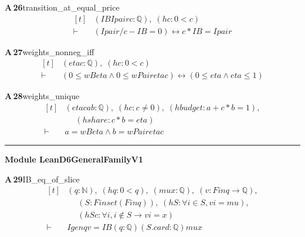 \documentclass[conference]{IEEEtran}
\theoremstyle{definition}
\newcommand{\lean}[1]{\textsf{\footnotesize #1}}
\begin{document}
\noindent\textbf{A\,26}\quad\lean{transition\_at\_equal\_price}
{\footnotesize\[ \begin{aligned}[t]
&(\mathit{IB} \mathit{Ipair} \mathit{c} : \mathbb{Q} ),\; (\mathit{hc} : 0 < \mathit{c})\\
\vdash\;&(\mathit{Ipair} / \mathit{c} - \mathit{IB} = 0) \leftrightarrow \mathit{c} * \mathit{IB} = \mathit{Ipair}
\end{aligned} \]}

\noindent\textbf{A\,27}\quad\lean{weights\_nonneg\_iff}
{\footnotesize\[ \begin{aligned}[t]
&(\mathit{eta} \mathit{c} : \mathbb{Q} ),\; (\mathit{hc} : 0 < \mathit{c})\\
\vdash\;&(0 \leq \mathit{wB} \mathit{eta} \wedge 0 \leq \mathit{wPair} \mathit{eta} \mathit{c}) \leftrightarrow (0 \leq \mathit{eta} \wedge \mathit{eta} \leq 1)
\end{aligned} \]}

\noindent\textbf{A\,28}\quad\lean{weights\_unique}
{\footnotesize\[ \begin{aligned}[t]
&(\mathit{eta} \mathit{c} \mathit{a} \mathit{b} : \mathbb{Q} ),\; (\mathit{hc} : \mathit{c} \neq 0),\; (\mathit{hbudget} : \mathit{a} + \mathit{c} * \mathit{b} = 1),\\
&\quad \; (\mathit{hshare} : \mathit{c} * \mathit{b} = \mathit{eta})\\
\vdash\;&\mathit{a} = \mathit{wB} \mathit{eta} \wedge \mathit{b} = \mathit{wPair} \mathit{eta} \mathit{c}
\end{aligned} \]}

\vspace{4pt}\noindent\rule{\columnwidth}{0.4pt}\par\vspace{2pt}
\noindent\textbf{Module \lean{LeanD6GeneralFamilyV1}}\par\vspace{3pt}

\noindent\textbf{A\,29}\quad\lean{IB\_eq\_of\_slice}
{\footnotesize\[ \begin{aligned}[t]
&(\mathit{q} : \mathbb{N} ),\; (\mathit{hq} : 0 < \mathit{q}),\; (\mathit{mu} \mathit{x} : \mathbb{Q} ),\; (\mathit{v} : \mathit{Fin} \mathit{q} \to \mathbb{Q} ),\\
&\quad \; (\mathit{S} : \mathit{Finset} (\mathit{Fin} \mathit{q})),\; (\mathit{hS} : \forall \mathit{i} \in \mathit{S}, \mathit{v} \mathit{i} = \mathit{mu}),\\
&\quad \; (\mathit{hSc} : \forall \mathit{i}, \mathit{i} \notin \mathit{S} \to \mathit{v} \mathit{i} = \mathit{x})\\
\vdash\;&\mathit{Igen} \mathit{q} \mathit{v} = \mathit{IB} (\mathit{q} : \mathbb{Q} ) (\mathit{S}.\mathit{card} : \mathbb{Q} ) \mathit{mu} \mathit{x}
\end{aligned} \]}
\end{document}

